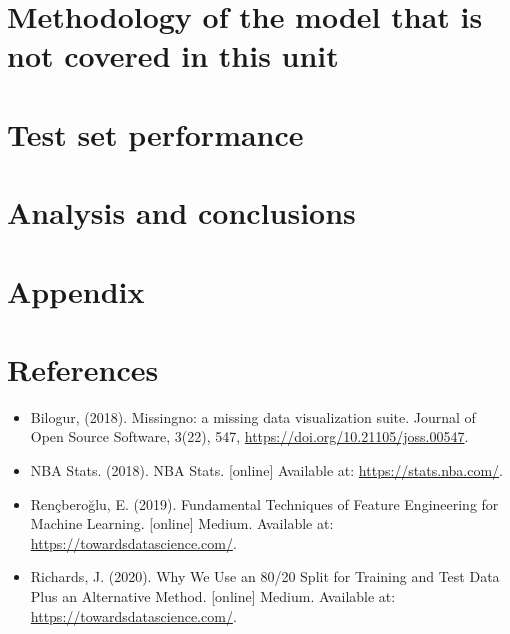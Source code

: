 \documentclass[letterpaper,12pt,twoside,]{pinp}
\begin{document}
\hypertarget{methodology-of-the-model-that-is-not-covered-in-this-unit}{%
\section{Methodology of the model that is not covered in this
unit}\label{methodology-of-the-model-that-is-not-covered-in-this-unit}}

\hypertarget{test-set-performance}{%
\section{Test set performance}\label{test-set-performance}}

\hypertarget{analysis-and-conclusions}{%
\section{Analysis and conclusions}\label{analysis-and-conclusions}}

\hypertarget{appendix}{%
\section{Appendix}\label{appendix}}

\hypertarget{references}{%
\section{References}\label{references}}

\begin{itemize}
\item
  Bilogur, (2018). Missingno: a missing data visualization suite.
  Journal of Open Source Software, 3(22), 547,
  \url{https://doi.org/10.21105/joss.00547}.
\item
  NBA Stats. (2018). NBA Stats. {[}online{]} Available at:
  \url{https://stats.nba.com/}.
\item
  Rençberoğlu, E. (2019). Fundamental Techniques of Feature Engineering
  for Machine Learning. {[}online{]} Medium. Available at:
  \url{https://towardsdatascience.com/}.
\item
  Richards, J. (2020). Why We Use an 80/20 Split for Training and Test
  Data Plus an Alternative Method. {[}online{]} Medium. Available at:
  \url{https://towardsdatascience.com/}.
\end{itemize}





\end{document}

